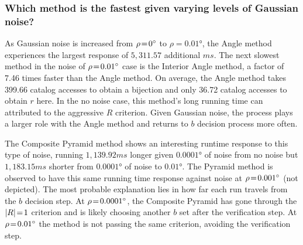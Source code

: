 \subsubsection{Which method is the fastest given varying levels of Gaussian noise?}
As Gaussian noise is increased from $\rho\!=\!\ang{0}$ to $\rho=\ang{0.01}$, the Angle method experiences the largest
response of $5{,}311.57$ additional $\si{ms}$.
The next slowest method in the noise of $\rho\!=\!\ang{0.01}$ case is the Interior Angle method, a factor of 7.46 times
faster than the Angle method.
On average, the Angle method takes 399.66 catalog accesses to obtain a bijection and only 36.72 catalog accesses
to obtain $r$ here.
In the no noise case, this method's long running time can attributed to the aggressive $R$ criterion.
Given Gaussian noise, the  process plays a larger role with the Angle method and returns to $b$
decision process more often.

The Composite Pyramid method shows an interesting runtime response to this type of noise, running $1{,}139.92\si{ms}$
longer given $\ang{0.0001}$ of noise from no noise but $1{,}183.15\si{ms}$ shorter from $\ang{0.0001}$ of noise to
$\ang{0.01}$.
The Pyramid method is observed to have this same running time response against noise at $\rho\!=\!\ang{0.001}$
(not depicted).
The most probable explanation lies in how far each run travels from the $b$ decision step.
At $\rho\!=\!\ang{0.0001}$, the Composite Pyramid has gone through the $\left| R \right| \!=\! 1$ criterion and is likely choosing
another $b$ set after the verification step.
At $\rho\!=\!\ang{0.01}$ the method is not passing the same criterion, avoiding the verification step.

